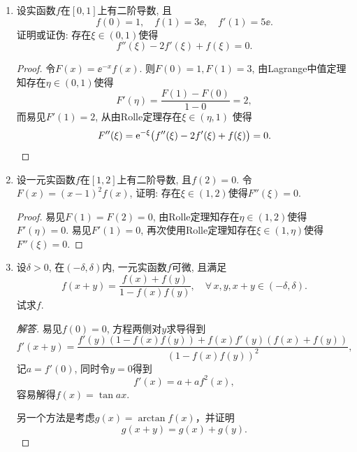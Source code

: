 \begin{1a}
\begin{enumerate}
\item 设实函数\(f\)在\([0,1]\)上有二阶导数, 且
\[f(0)=1,\quad f(1)=3\ee,\quad f'(1)=5\ee.\]
证明或证伪: 存在\(\xi\in(0,1)\)使得\[f''(\xi)-2f'(\xi)+f(\xi)=0.\]
\begin{proof}
令\(F(x)=\ee^{-x}f(x).\) 则\(F(0)=1,F(1)=3\), 由Lagrange中值定理知存在\(\eta\in(0,1)\)使得
\[F'(\eta)=\frac{F(1)-F(0)}{1-0}=2,\]
而易见\(F'(1)=2\), 从由Rolle定理存在\(\xi\in(\eta,1)\)
使得\[F''(\xi)=\mathrm{e}^{-\xi}\big(f''(\xi)-2f'(\xi)+f(\xi)\big)=0.\qedhere\]
\end{proof}
\item 设一元实函数\(f\)在\([1,2]\)上有二阶导数, 且\(f(2)=0\). 
令\(F(x)=(x-1)^2f(x)\), 证明: 存在\(\xi\in(1,2)\)使得\(F''(\xi)=0.\)
\begin{proof}
易见\(F(1)=F(2)=0\), 由Rolle定理知存在\(\eta\in(1,2)\)使得\(F'(\eta)=0\). 
易见\(F'(1)=0\), 再次使用Rolle定理知存在\(\xi\in(1,\eta)\)使得\(F''(\xi)=0\).
\end{proof}
\item 设\(\delta>0\), 在\((-\delta,\delta)\)内, 一元实函数\(f\)可微, 且满足
\[f(x+y)=\frac{f(x)+f(y)}{1-f(x)f(y)},\quad\forall\,x,y,x+y\in(-\delta,\delta).\]
试求\(f\).
\begin{proof}[解答]
易见\(f(0)=0\), 方程两侧对\(y\)求导得到
\[f'(x+y)=\frac{f'(y)\left(1-f(x)f(y)\right)+f(x)f'(y)\left(f(x)+f(y)\right)}{(1-f(x)f(y))^2},\]
记\(a=f'(0)\), 同时令\(y=0\)得到\[f'(x)=a+af^2(x),\]容易解得\(f(x)=\tan ax\).

另一个方法是考虑\(g(x)=\arctan f(x)\)，并证明\[g(x+y)=g(x)+g(y).\]


\end{proof}
\end{enumerate}
\end{1a}
